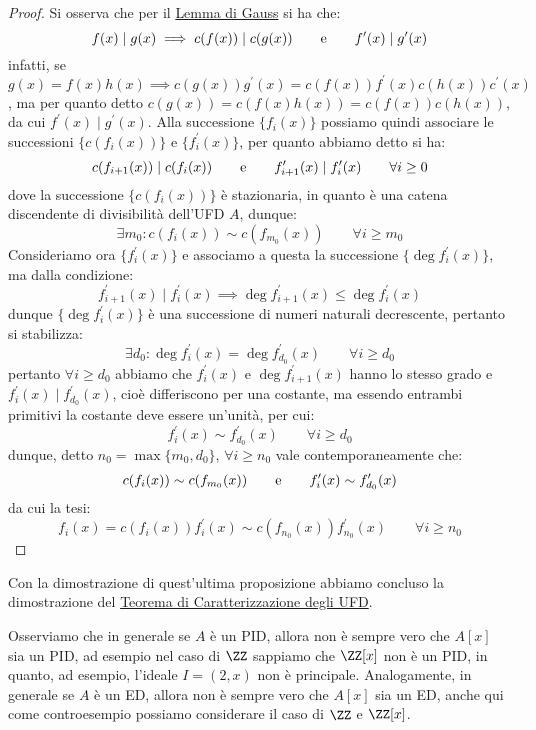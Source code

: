 \documentclass[11pt]{scrartcl}
\begin{document}
\begin{proof}
    Si osserva che per il \hyperref[gauss]{Lemma di Gauss} si ha che:
    \[ f(x) \mid g(x) \implies c(f(x)) \mid c(g(x)) \qquad \text e \qquad f^{\prime}(x) \mid g^{\prime}(x)
        \]
    infatti, se $g(x) = f(x) h(x) \implies c(g(x))g^{\prime}(x) = c(f(x))f^{\prime}(x)c(h(x))c^{\prime}(x)$,
    ma per quanto detto $c(g(x)) = c(f(x)h(x)) = c(f(x))c(h(x))$, da cui $f^{\prime}(x) \mid g^{\prime}(x)$.
    Alla successione $\{f_i(x)\}$ possiamo quindi associare le successioni $\{c(f_i(x))\}$ e $\{f_i^{\prime}(x)\}$, per quanto abbiamo detto si ha:
    \[ c(f_{i+1}(x)) \mid c(f_{i}(x)) \qquad \text e \qquad f_{i+1}^{\prime}(x) \mid f_i^{\prime}(x) \qquad \forall i \geq 0
        \]
    dove la successione $\{c(f_i(x))\}$ è stazionaria, in quanto è una catena discendente di divisibilità dell'UFD $A$, dunque:
    \[ \exists m_0 : c(f_i(x)) \sim c(f_{m_0}(x)) \qquad \forall i \geq m_0
        \]
    Consideriamo ora $\{f_i^{\prime}(x)\}$ e associamo a questa la successione $\{\deg f_i^{\prime}(x)\}$, ma dalla condizione:
    \[ f_{i+1}^{\prime}(x) \mid f_i^{\prime}(x) \implies \deg f_{i+1}^{\prime}(x) \leq \deg f_i^{\prime}(x)
        \]
    dunque $\{\deg f_i^{\prime}(x)\}$ è una successione di numeri naturali decrescente, pertanto si stabilizza:
    \[ \exists d_0 : \deg f_{i}^{\prime}(x) = \deg f_{d_0}^{\prime}(x) \qquad \forall i \geq d_0
        \]
    pertanto $\forall i \geq d_0$ abbiamo che $f_i^{\prime}(x)$ e $\deg f_{i+1}^{\prime}(x)$ hanno lo stesso grado e $f_{i}^{\prime}(x) \mid f_{d_0}^{\prime}(x)$,
    cioè differiscono per una costante, ma essendo entrambi primitivi la costante deve essere un'unità, per cui:
    \[ f_{i}^{\prime}(x) \sim f_{d_0}^{\prime}(x) \qquad \forall i \geq d_0
        \]
    dunque, detto $n_0 = \max\{m_0,d_0\}$, $\forall i \geq n_0$ vale contemporaneamente che:
    \[ c(f_i(x)) \sim c(f_{m_0}(x)) \qquad \text e \qquad f_{i}^{\prime}(x) \sim f_{d_0}^{\prime}(x)
        \]
    da cui la tesi:
    \[ f_i(x) = c(f_i(x))f_{i}^{\prime}(x) \sim c(f_{n_0}(x))f_{n_0}^{\prime}(x) \qquad \forall i \geq n_0
        \]
\end{proof}

Con la dimostrazione di quest'ultima proposizione abbiamo concluso la dimostrazione del \hyperref[2.109]{Teorema di Caratterizzazione degli UFD}.

\begin{remark}
    Osserviamo che in generale se $A$ è un PID, allora non è sempre vero che $A[x]$ sia un PID, ad esempio nel caso di $\ZZ$ sappiamo che $\ZZ[x]$ non è un PID, in quanto,
    ad esempio, l'ideale $I = (2,x)$ non è principale. Analogamente, in generale se $A$ è un ED, allora non è sempre vero che $A[x]$ sia un ED, anche qui come controesempio possiamo 
    considerare il caso di $\ZZ$ e $\ZZ[x]$.
\end{remark}
\end{document}
